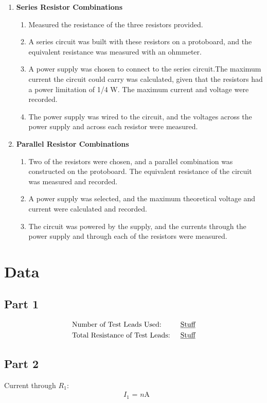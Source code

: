 \documentclass[twocolumn,english]{IEEEtran}
\theoremstyle{plain}
\theoremstyle{plain}
\begin{document}
\begin{enumerate}
 \item \textbf{Series Resistor Combinations} \begin{enumerate}
        \item Measured the resistance of the three resistors provided.
        \item A series circuit was built with these resistors on a protoboard, and the equivalent resistance was measured with an ohmmeter.
        \item A power supply was chosen to connect to the series circuit.The maximum current the circuit could carry was calculated, given that the resistors had a power limitation of 1/4 W. The maximum current and voltage were recorded.
        \item The power supply was wired to the circuit, and the voltages across the power supply and across each resistor were measured.
       \end{enumerate}
  \item \textbf{Parallel Resistor Combinations} \begin{enumerate}
         \item Two of the resistors were chosen, and a parallel combination was constructed on the protoboard. The equivalent resistance of the circuit was measured and recorded.
         \item A power supply was selected, and the maximum theoretical voltage and current were calculated and recorded.
         \item The circuit was powered by the supply, and the currents through the power supply and through each of the resistors were measured.
        \end{enumerate}
\end{enumerate}

\section{Data}
  \subsection*{\textbf{Part 1}}
  \begin{align*}
   &\text{Number of Test Leads Used:}		&\text{\underline{Stuff}} \\
   &\text{Total Resistance of Test Leads: }	&\text{\underline{Stuff}}
  \end{align*}

  \subsection*{\textbf{Part 2}}
  Current through $R_1$:
  \begin{align*}
   &\text{$I_1$ = $n$A}
  \end{align*}
\end{document}
